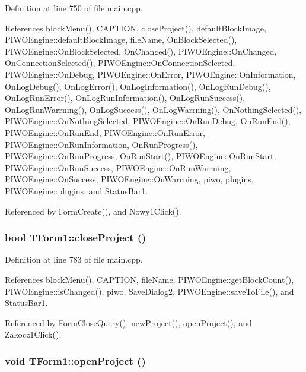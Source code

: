 Definition at line 750 of file main.cpp.

References blockMenu(), CAPTION, closeProject(), defaultBlockImage, PIWOEngine::defaultBlockImage, fileName, OnBlockSelected(), PIWOEngine::OnBlockSelected, OnChanged(), PIWOEngine::OnChanged, OnConnectionSelected(), PIWOEngine::OnConnectionSelected, PIWOEngine::OnDebug, PIWOEngine::OnError, PIWOEngine::OnInformation, OnLogDebug(), OnLogError(), OnLogInformation(), OnLogRunDebug(), OnLogRunError(), OnLogRunInformation(), OnLogRunSuccess(), OnLogRunWarrning(), OnLogSuccess(), OnLogWarrning(), OnNothingSelected(), PIWOEngine::OnNothingSelected, PIWOEngine::OnRunDebug, OnRunEnd(), PIWOEngine::OnRunEnd, PIWOEngine::OnRunError, PIWOEngine::OnRunInformation, OnRunProgress(), PIWOEngine::OnRunProgress, OnRunStart(), PIWOEngine::OnRunStart, PIWOEngine::OnRunSuccess, PIWOEngine::OnRunWarrning, PIWOEngine::OnSuccess, PIWOEngine::OnWarrning, piwo, plugins, PIWOEngine::plugins, and StatusBar1.

Referenced by FormCreate(), and Nowy1Click().\hypertarget{classTForm1_2a46f5c794da332c1e9dd55ac0c03834}{
\subsubsection[closeProject]{\setlength{\rightskip}{0pt plus 5cm}bool TForm1::closeProject ()}}
\label{classTForm1_2a46f5c794da332c1e9dd55ac0c03834}




Definition at line 783 of file main.cpp.

References blockMenu(), CAPTION, fileName, PIWOEngine::getBlockCount(), PIWOEngine::isChanged(), piwo, SaveDialog2, PIWOEngine::saveToFile(), and StatusBar1.

Referenced by FormCloseQuery(), newProject(), openProject(), and Zakocz1Click().\hypertarget{classTForm1_a776111b5ba217e343c407bf9bebc00b}{
\subsubsection[openProject]{\setlength{\rightskip}{0pt plus 5cm}void TForm1::openProject ()}}
\label{classTForm1_a776111b5ba217e343c407bf9bebc00b}




